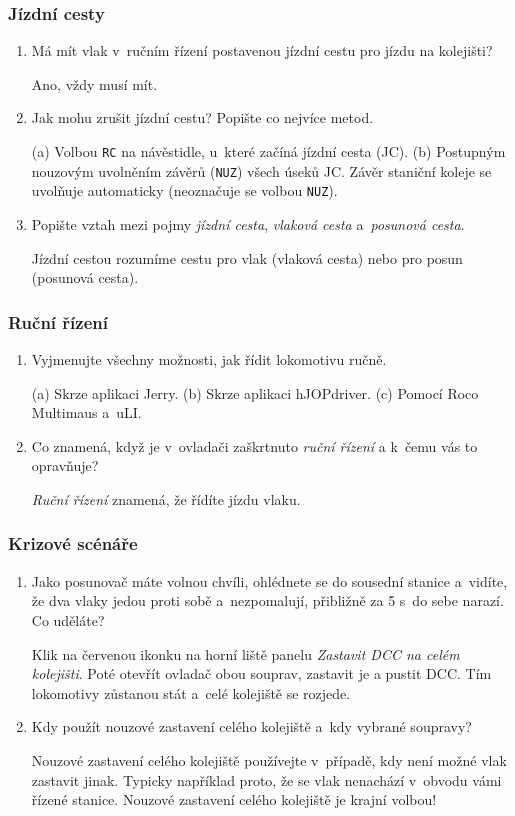 \documentclass[12pt,a4paper]{article}
\def\solution#1{\ifsolution \par{\color{gray}#1}\fi}
\begin{document}
\subsubsection*{Jízdní cesty}
\begin{enumerate}[leftmargin=*]
\item Má mít vlak v~ručním řízení postavenou jízdní cestu pro jízdu na
kolejišti?
\solution{Ano, vždy musí mít.}

\item Jak mohu zrušit jízdní cestu? Popište co nejvíce metod.
\solution{(a) Volbou \texttt{RC} na návěstidle, u~které začíná jízdní cesta
(JC). (b) Postupným nouzovým uvolněním závěrů (\texttt{NUZ}) všech úseků JC.
Závěr staniční koleje se uvolňuje automaticky (neoznačuje se volbou \texttt{NUZ}).}

\item Popište vztah mezi pojmy \textit{jízdní cesta}, \textit{vlaková cesta}
a~\textit{posunová cesta}.
\solution{Jízdní cestou rozumíme cestu pro vlak (vlaková cesta) nebo pro posun
(posunová cesta).}

\end{enumerate}

\subsubsection*{Ruční řízení}
\begin{enumerate}[leftmargin=*]
\item Vyjmenujte všechny možnosti, jak řídit lokomotivu ručně.
\solution{(a) Skrze aplikaci Jerry. (b) Skrze aplikaci hJOPdriver. (c) Pomocí
Roco Multimaus a~uLI.}

\item Co znamená, když je v~ovladači zaškrtnuto \textit{ruční řízení}
a k~čemu vás to opravňuje?
\solution{\textit{Ruční řízení} znamená, že řídíte jízdu vlaku.}

\end{enumerate}

\subsubsection*{Krizové scénáře}
\begin{enumerate}[leftmargin=*]
\item Jako posunovač máte volnou chvíli, ohlédnete se do sousední stanice
a~vidíte, že dva vlaky jedou proti sobě a~nezpomalují, přibližně za 5 s~do sebe
narazí. Co uděláte?
\solution{Klik na červenou ikonku na horní liště panelu \textit{Zastavit DCC
na celém kolejišti}. Poté otevřít ovladač obou souprav, zastavit je a pustit
DCC. Tím lokomotivy zůstanou stát a~celé kolejiště se rozjede.}

\item Kdy použít nouzové zastavení celého kolejiště a~kdy vybrané soupravy?
\solution{Nouzové zastavení celého kolejiště používejte v~případě, kdy není
možné vlak zastavit jinak. Typicky například proto, že se vlak nenachází
v~obvodu vámi řízené stanice. Nouzové zastavení celého kolejiště je krajní
volbou!}

\end{enumerate}
\end{document}
